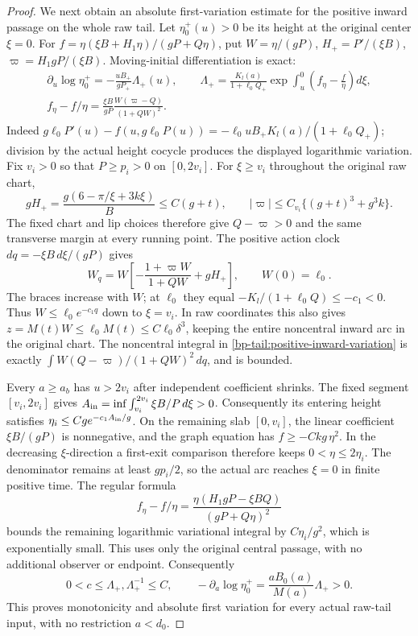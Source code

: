 \begin{proof}
We next obtain an absolute first-variation estimate for the positive
inward passage on the whole raw tail. Let
\(\eta_0^+(u)>0\) be its height at the original center \(\xi=0\).
For \(f=\eta(\xi B+H_1\eta)/(gP+Q\eta)\), put
\(W=\eta/(gP)\), \(H_+=P'/(\xi B)\),
\(\varpi=H_1gP/(\xi B)\). Moving-initial differentiation is exact:
\begin{equation}\label{bp-tail:positive-inward-variation}
 \begin{gathered}
 \partial_u\log\eta_0^+=-\frac{uB_+}{gP_+}\Lambda_+(u),\qquad
 \Lambda_+=\frac{K_l(a)}{1+\ell_0Q_+}
                  \exp\int_u^0\left(f_\eta-\frac f\eta\right)d\xi,\\
 f_\eta-f/\eta=\frac{\xi B}{gP}
                 \frac{W(\varpi-Q)}{(1+QW)^2}.
 \end{gathered}
\end{equation}
Indeed \(g\ell_0P'(u)-f(u,g\ell_0P(u))
=-\ell_0uB_+K_l(a)/(1+\ell_0Q_+)\); division by the actual
height cocycle produces the displayed logarithmic variation.
Fix \(v_i>0\) so that \(P\ge p_i>0\) on \([0,2v_i]\).
For \(\xi\ge v_i\) throughout the original raw chart,
\[
 gH_+=\frac{g(6-\pi/\xi+3k\xi)}B\le C(g+t),\qquad
 |\varpi|\le C_{v_i}\{(g+t)^3+g^3k\}.
\]
The fixed chart and lip choices therefore give \(Q-\varpi>0\)
and the same transverse margin at every running point.
The positive action clock \(dq=-\xi B\,d\xi/(gP)\) gives
\[
 W_q=W\left[-\frac{1+\varpi W}{1+QW}+gH_+\right],\qquad W(0)=\ell_0.
\]
The braces increase with \(W\); at \(\ell_0\) they equal
\(-K_l/(1+\ell_0Q)\le-c_1<0\). Thus
\(W\le\ell_0e^{-c_1q}\) down to \(\xi=v_i\).
In raw coordinates this also gives
\(z=M(t)W\le\ell_0M(t)\le C\ell_0\delta^3\), keeping the
entire noncentral inward arc in the original chart.
The noncentral integral in \eqref{bp-tail:positive-inward-variation}
is exactly \(\int W(Q-\varpi)/(1+QW)^2\,dq\), and is bounded.

Every \(a\ge a_b\) has \(u>2v_i\) after independent coefficient
shrinks. The fixed segment \([v_i,2v_i]\) gives
\(A_{\rm in}=\inf\int_{v_i}^{2v_i}\xi B/P\,d\xi>0\).
Consequently its entering height satisfies
\(\eta_i\le Cg e^{-c_1A_{\rm in}/g}\).
On the remaining slab \([0,v_i]\), the linear coefficient
\(\xi B/(gP)\) is nonnegative, and the graph equation has
\(f\ge-Ckg\,\eta^2\). In the decreasing \(\xi\)-direction a
first-exit comparison therefore keeps \(0<\eta\le2\eta_i\).
The denominator remains at least \(gp_i/2\), so the actual
arc reaches \(\xi=0\) in finite positive time. The regular formula
\[
 f_\eta-f/\eta
 =\frac{\eta(H_1gP-\xi BQ)}{(gP+Q\eta)^2}
\]
bounds the remaining logarithmic variational integral by
\(C\eta_i/g^2\), which is exponentially small. This uses only the
original central passage, with no additional observer or endpoint.
Consequently
\begin{equation}\label{bp-tail:positive-inward-absolute}
 0<c\le\Lambda_+,\Lambda_+^{-1}\le C,
 \qquad -\partial_a\log\eta_0^+
             =\frac{aB_0(a)}{M(a)}\Lambda_+>0.
\end{equation}
This proves monotonicity and absolute first variation for every actual
raw-tail input, with no restriction \(a<d_0\).


\end{proof}
